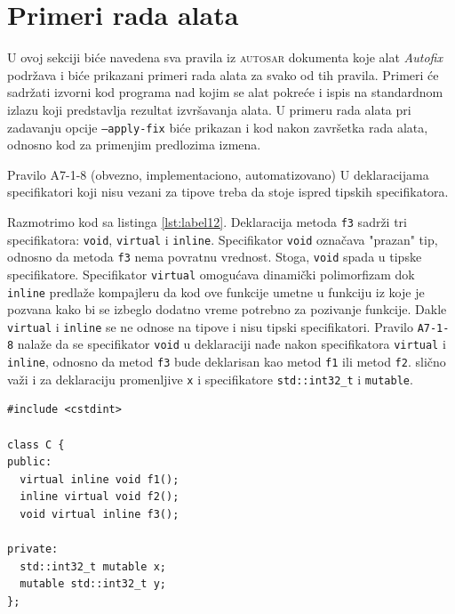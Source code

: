 \documentclass[12pt,oneside]{memoir}
\begin{document}
\section{Primeri rada alata}

U ovoj sekciji bi\'{c}e navedena sva pravila iz \textsc{autosar} dokumenta koje alat \textit{Autofix} podr\v{z}ava i bi\'{c}e prikazani primeri rada alata za svako od tih pravila.
Primeri \'{c}e sadr\v{z}ati izvorni kod programa nad kojim se alat pokre\'{c}e i ispis na standardnom izlazu koji predstavlja rezultat izvr\v{s}avanja alata. U primeru rada alata
pri zadavanju opcije \texttt{--apply-fix} bi\'{c}e prikazan i kod nakon zavr\v{s}etka rada alata, odnosno kod za primenjim predlozima izmena.\\

\begin{primer}
         Pravilo A7-1-8 (obvezno, implementaciono, automatizovano) \newline
         U deklaracijama specifikatori koji nisu vezani za tipove treba da stoje
         ispred tipskih specifikatora.
\end{primer}

Razmotrimo kod sa listinga \ref{lst:label12}. Deklaracija metoda \texttt{f3} sadr\v{z}i tri specifikatora: \texttt{void}, \texttt{virtual} i \texttt{inline}.
Specifikator \texttt{void} ozna\v{c}ava "prazan" tip, odnosno da metoda \texttt{f3} nema povratnu vrednost. Stoga, \texttt{void} spada u tipske specifikatore.
Specifikator \texttt{virtual} omogu\'{c}ava dinami\v{c}ki polimorfizam dok \texttt{inline} predla\v{z}e kompajleru da kod ove funkcije umetne u funkciju iz koje je pozvana
kako bi se izbeglo dodatno vreme potrebno za pozivanje funkcije. Dakle \texttt{virtual} i \texttt{inline} se ne odnose na tipove i nisu tipski specifikatori. Pravilo
\texttt{A7-1-8} nala\v{z}e da se specifikator \texttt{void} u deklaraciji nađe nakon specifikatora \texttt{virtual} i  \texttt{inline}, odnosno da metod \texttt{f3} bude
deklarisan kao metod \texttt{f1} ili metod \texttt{f2}. sli\v{c}no va\v{z}i i za deklaraciju promenljive \texttt{x} i specifikatore \texttt{std::int32\_t} i \texttt{mutable}. \\ 


\begin{lstlisting}[style=customc, caption={Primer koda koji nije napisan u skladu sa pravilom A7-1-8}, label=lst:label12, captionpos=b]
#include <cstdint>

class C {
public:
  virtual inline void f1();
  inline virtual void f2();
  void virtual inline f3();

private:
  std::int32_t mutable x;
  mutable std::int32_t y;
};
\end{lstlisting}
\end{document}
